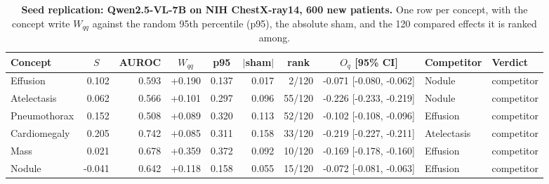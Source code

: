 \begin{table}[t]
\centering
\scriptsize
\setlength{\tabcolsep}{4pt}

\caption{\textbf{Seed replication: Qwen2.5-VL-7B on NIH ChestX-ray14, 600 new patients.} One row per concept, with the concept write $W_{qq}$ against the random 95th percentile (p95), the absolute sham, and the 120 compared effects it is ranked among.}
\label{tab:cf-seed}
\begin{tabular}{lrrrrrrrll}
\toprule
Concept & \multicolumn{1}{c}{$S$} & \multicolumn{1}{c}{AUROC} & \multicolumn{1}{c}{$W_{qq}$} & \multicolumn{1}{c}{p95} & \multicolumn{1}{c}{$|$sham$|$} & \multicolumn{1}{c}{rank} & \multicolumn{1}{c}{$O_q$ [95\% CI]} & Competitor & Verdict\\
\midrule
Effusion & 0.102 & 0.593 & +0.190 & 0.137 & 0.017 & 2/120 & \cellcolor{cfTerra2}-0.071 [-0.080, -0.062] & Nodule & competitor \\
Atelectasis & 0.062 & 0.566 & +0.101 & 0.297 & 0.096 & 55/120 & \cellcolor{cfTerra3}-0.226 [-0.233, -0.219] & Nodule & competitor \\
Pneumothorax & 0.152 & 0.508 & +0.089 & 0.320 & 0.113 & 52/120 & \cellcolor{cfTerra3}-0.102 [-0.108, -0.096] & Effusion & competitor \\
Cardiomegaly & 0.205 & 0.742 & +0.085 & 0.311 & 0.158 & 33/120 & \cellcolor{cfTerra3}-0.219 [-0.227, -0.211] & Atelectasis & competitor \\
Mass & 0.021 & 0.678 & +0.359 & 0.372 & 0.092 & 10/120 & \cellcolor{cfTerra3}-0.169 [-0.178, -0.160] & Effusion & competitor \\
Nodule & -0.041 & 0.642 & +0.118 & 0.158 & 0.055 & 15/120 & \cellcolor{cfTerra2}-0.072 [-0.081, -0.063] & Effusion & competitor \\
\bottomrule
\end{tabular}
\end{table}
